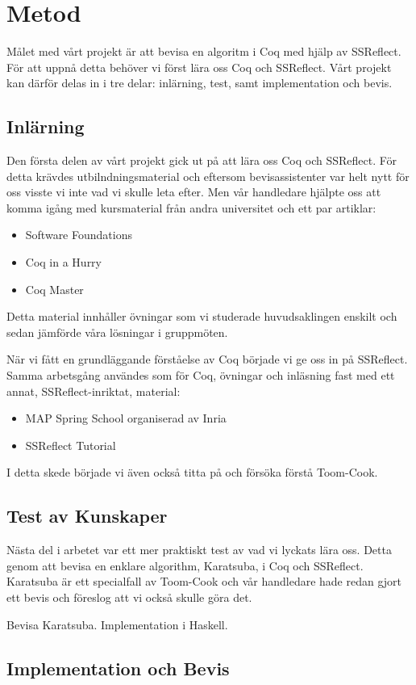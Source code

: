 \section{Metod}
Målet med vårt projekt är att bevisa en algoritm i Coq med hjälp av SSReflect.
För att uppnå detta behöver vi först lära oss Coq och SSReflect. Vårt projekt
kan därför delas in i tre delar: inlärning, test, samt implementation och
bevis.

\subsection{Inlärning}
Den första delen av vårt projekt gick ut på att lära oss Coq och SSReflect. För
detta krävdes utbilndningsmaterial och eftersom bevisassistenter var helt nytt
för oss visste vi inte vad vi skulle leta efter. Men vår handledare hjälpte oss
att komma igång med kursmaterial från andra universitet och ett par artiklar:
\begin{itemize}
  \item Software Foundations
  \item Coq in a Hurry
  \item Coq Master
\end{itemize}
Detta material innhåller övningar som vi studerade huvudsaklingen enskilt och
sedan jämförde våra lösningar i gruppmöten.

När vi fått en grundläggande förståelse av Coq började vi ge oss in på
SSReflect. Samma arbetsgång användes som för Coq, övningar och inläsning fast
med ett annat, SSReflect-inriktat, material:
\begin{itemize}
  \item MAP Spring School organiserad av Inria
  \item SSReflect Tutorial
\end{itemize}
I detta skede började vi även också titta på och försöka förstå Toom-Cook.

\subsection{Test av Kunskaper}
Nästa del i arbetet var ett mer praktiskt test av vad vi lyckats lära oss.
Detta genom att bevisa en enklare algorithm, Karatsuba, i Coq och SSReflect.
Karatsuba är ett specialfall av Toom-Cook och vår handledare hade redan gjort
ett bevis och föreslog att vi också skulle göra det.

Bevisa Karatsuba. Implementation i Haskell.

\subsection{Implementation och Bevis}
